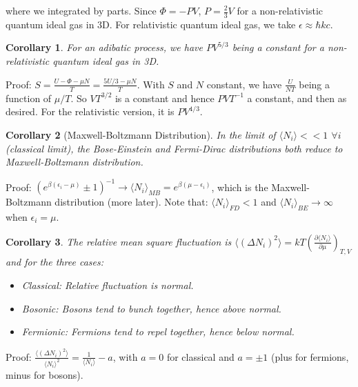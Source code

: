 \documentclass[a4paper]{article}
\newtheorem{cor}{Corollary}[section]
\theoremstyle{new}
\begin{document}
where we integrated by parts. Since $\Phi=-PV$, $P=\frac{2}{3}V$ for a non-relativistic quantum ideal gas in 3D. For relativistic quantum ideal gas, we take $\epsilon\approx\hbar kc$.
\begin{cor}
For an adibatic process, we have $PV^{5/3}$ being a constant for a non-relativistic quantum ideal gas in 3D.
\end{cor}
Proof: $S=\frac{U-\Phi-\mu N}{T}=\frac{5U/3-\mu N}{T}$. With $S$ and $N$ constant, we have $\frac{U}{NT}$ being a function of $\mu/T$. So $VT^{3/2}$ is a constant and hence $PVT^{-1}$ a constant, and then as desired. For the relativistic version, it is $PV^{4/3}$.
\begin{cor}[Maxwell-Boltzmann Distribution]
In the limit of $\langle N_i\rangle<<1$ $\forall i$ (classical limit), the Bose-Einstein and Fermi-Dirac distributions both reduce to Maxwell-Boltzmann distribution.
\end{cor}
Proof: $(e^{\beta(\epsilon_i-\mu)}\pm1)^{-1}\rightarrow\langle N_i\rangle_{MB}=e^{\beta(\mu-\epsilon_i)}$, which is the Maxwell-Boltzmann distribution (more later). Note that: $\langle N_i\rangle_{FD}<1$ and $\langle N_i\rangle_{BE}\rightarrow\infty$ when $\epsilon_i=\mu$.
\begin{cor}
The relative mean square fluctuation is $\langle(\Delta N_i)^2\rangle=kT(\frac{\partial\langle N_i\rangle}{\partial\mu})_{T,V}$ and for the three cases:
\begin{itemize}
    \item Classical: Relative fluctuation is normal.
    \item Bosonic: Bosons tend to bunch together, hence above normal.
    \item Fermionic: Fermions tend to repel together, hence below normal.
\end{itemize}
\end{cor}
Proof: $\frac{\langle(\Delta N_i)^2\rangle}{\langle N_i\rangle^2}=\frac{1}{\langle N_i\rangle}-a$, with $a=0$ for classical and $a=\pm1$ (plus for fermions, minus for bosons). 
\end{document}
